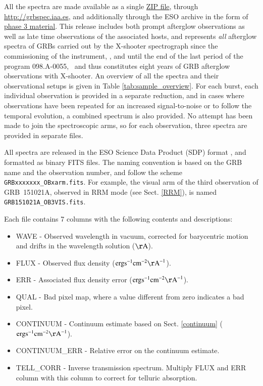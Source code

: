 \documentclass{aa}    %
\begin{document}
All the spectra are made available as a single
\href{http://www.dark-cosmology.dk/~jselsing/XSGRB}{ZIP file}, through
\url{http://grbspec.iaa.es}, and additionally through the ESO archive in the
form of \href{http://archive.eso.org/wdb/wdb/adp/phase3_main/form}{phase 3
	material}. This release includes both prompt afterglow observations as well as
late time observations of the associated hosts, and represents \textit{all}
afterglow spectra of GRBs carried out by the X-shooter spectrograph since the
commissioning of the instrument, \startdate, and until the end of the last
period of the program 098.A-0055, \termdate~and thus constitutes eight years of GRB
afterglow observations with X-shooter. An overview of all the spectra and their
observational setups is given in Table \ref{tab:sample_overview}. For each
burst, each individual observation is provided in a separate reduction, and in
cases where observations have been repeated for an increased signal-to-noise or
to follow the temporal evolution, a combined spectrum is also provided. No
attempt has been made to join the spectroscopic arms, so for each observation,
three spectra are provided in separate files.

All spectra are released in the ESO Science Data Product (SDP) format
\citep{Micol2016}, and formatted as binary FITS files. The naming convention is
based on the GRB name and the observation number, and follow the scheme
\texttt{GRBxxxxxxx\_OBxarm.fits}. For example, the visual arm of the third
observation of GRB~151021A, observed in RRM mode (see Sect. \ref{RRM}), is named
\texttt{GRB151021A\_OB3VIS.fits}.

Each file contains 7 columns with the following contents and descriptions:
\begin{itemize}
	
	\item WAVE - Observed wavelength in vacuum, corrected for barycentric motion
	and drifts in the wavelength solution ($\mathrm{\AA}$).
	
	\item FLUX - Observed flux density ($\mathrm{erg} \mathrm{s}^{-1}
	\mathrm{cm}^{-2} \mathrm{\AA}^{-1}$).
	
	\item ERR - Associated flux density error ($\mathrm{erg} \mathrm{s}^{-1}
	\mathrm{cm}^{-2} \mathrm{\AA}^{-1}$).
	
	\item QUAL - Bad pixel map, where a value different from zero indicates a bad
	pixel.
	
	\item CONTINUUM - Continuum estimate based on Sect. \ref{continuum}
	($\mathrm{erg} \mathrm{s}^{-1} \mathrm{cm}^{-2} \mathrm{\AA}^{-1}$).
	
	\item CONTINUUM\_ERR - Relative error on the continuum estimate.
	
	\item TELL\_CORR - Inverse transmission spectrum. Multiply FLUX and ERR column
	with this column to correct for telluric absorption.
	 
\end{itemize}
\end{document}

